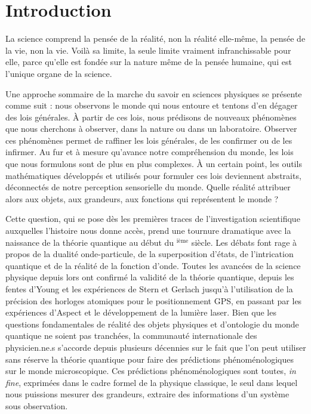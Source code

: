 \chapter*{Introduction}\label{chapter:intro}
 \mtcaddchapter
{}
\begin{fquote}
La science comprend la pensée de la réalité, non la réalité elle-même, la pensée de la vie, non la vie. Voilà sa limite, la seule limite vraiment infranchissable pour elle, parce qu'elle est fondée sur la nature même de la pensée humaine, qui est l'unique organe de la science.
\end{fquote}

Une approche sommaire de la marche du savoir en sciences physiques se présente comme suit : nous observons le monde qui nous entoure et tentons d'en dégager des lois générales.
À partir de ces lois, nous prédisons de nouveaux phénomènes que nous cherchons à observer, dans la nature ou dans un laboratoire.
Observer ces phénomènes permet de raffiner les lois générales, de les confirmer ou de les infirmer.
Au fur et à mesure qu'avance notre compréhension du monde, les lois que nous formulons sont de plus en plus complexes.
\`A un certain point, les outils mathématiques développés et utilisés pour formuler ces lois deviennent abstraits, déconnectés de notre perception sensorielle du monde.
Quelle \og réalité \fg{} attribuer alors aux objets, aux grandeurs, aux fonctions qui représentent le monde ?

\newcommand{\rom}[1]{\uppercase\expandafter{\romannumeral #1\relax}}
Cette question, qui se pose dès les premières traces de l'investigation scientifique auxquelles l'histoire nous donne accès, prend une tournure dramatique avec la naissance de la théorie quantique au début du \rom{20}$^{\text{ième}}$ siècle.
Les débats font rage à propos de la dualité onde-particule, de la superposition d'états, de l'intrication quantique et de la réalité de la fonction d'onde.
Toutes les avancées de la science physique depuis lors ont confirmé la validité de la théorie quantique, depuis les fentes d'Young et les expériences de Stern et Gerlach jusqu'à l'utilisation de la précision des horloges atomiques pour le positionnement GPS, en passant par les expériences d'Aspect et le développement de la lumière laser.
Bien que les questions fondamentales de réalité des objets physiques et d'ontologie du monde quantique ne soient pas tranchées, la communauté internationale des physicien.ne.s s'accorde depuis plusieurs décennies sur le fait que l'on peut utiliser sans réserve la théorie quantique pour faire des prédictions phénoménologiques sur le monde microscopique.
Ces prédictions phénoménologiques sont toutes, \textit{in fine}, exprimées dans le cadre formel de la physique classique, le seul dans lequel nous puissions mesurer des grandeurs, extraire des informations d'un système sous observation.

